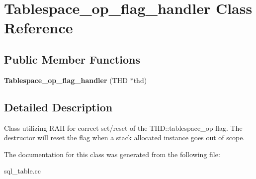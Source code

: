 \hypertarget{classTablespace__op__flag__handler}{}\section{Tablespace\+\_\+op\+\_\+flag\+\_\+handler Class Reference}
\label{classTablespace__op__flag__handler}
\subsection*{Public Member Functions}
\begin{DoxyCompactItemize}
\item 
\mbox{\label{classTablespace__op__flag__handler_a3c4008d5d285c7e757d4feef8f605366}} 
{\bfseries Tablespace\+\_\+op\+\_\+flag\+\_\+handler} (T\+HD $\ast$thd)
\end{DoxyCompactItemize}


\subsection{Detailed Description}
Class utilizing R\+A\+II for correct set/reset of the T\+H\+D\+::tablespace\+\_\+op flag. The destructor will reset the flag when a stack allocated instance goes out of scope. 

The documentation for this class was generated from the following file\+:\begin{DoxyCompactItemize}
\item 
sql\+\_\+table.\+cc\end{DoxyCompactItemize}

